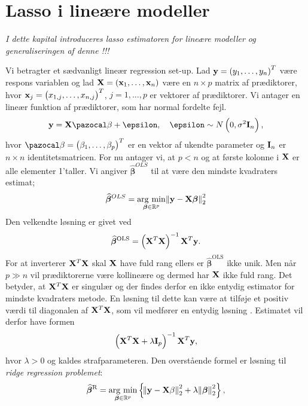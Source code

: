 \chapter{Lasso i lineære modeller}
\textit{I dette kapital introduceres lasso estimatoren for lineære modeller og generaliseringen af denne !!!}

Vi betragter et sædvanligt lineær regression set-up. Lad $\textbf{y} = \del{y_1, \dots, y_n}^T$ være respons variablen og lad $\textbf{X} = \del{\textbf{x}_1, \dots, \textbf{x}_n}$ være en $n \times p$ matrix af prædiktorer, hvor $\textbf{x}_j = \del{x_{1,j}, \dots, x_{n,j}}^T$, $j = 1, \dots, p$ er vektorer af prædiktorer. 
Vi antager en lineær funktion af prædiktorer, som har normal fordelte fejl. 
\begin{align*}
\textbf{y} = \textbf{X} \mathcal{\beta} + \epsilon, \quad \epsilon \sim N \del{0, \sigma^2 \text{\textbf{I}}_n},
\end{align*}
hvor $\mathcal{\beta} = \del{\beta_1, \dots, \beta_p}^T$ er en vektor af ukendte parameter og $\text{\textbf{I}}_n$ er $n \times n$ identitetsmatricen. 
For nu antager vi, at $p<n$ og at første kolonne i $\mathbf{X}$ er alle elementer 1'taller. 
Vi angiver $\widehat{\boldsymbol{\beta}}^{OLS}$ til at være den mindste kvadraters estimat;
\begin{align*}
\widehat{\boldsymbol{\beta}}^{OLS} = \underset{\boldsymbol\beta \in \mathbb{R}^p}{\operatorname*{\arg\,\min}} \norm{ \textbf{y} - \textbf{X}\boldsymbol\beta}^2_2
\end{align*}
Den velkendte løsning er givet ved 
\begin{align*}
\widehat{\boldsymbol\beta}^{\text{OLS}} = \del{\X^T \X}^{-1} \X^T \y.
\end{align*}
For at inverterer $\mathbf{X}^T \mathbf{X}$ skal $\mathbf{X}$ have fuld rang ellers er $\widehat{\boldsymbol\beta}^{\text{OLS}}$ ikke unik. 
Men når  \(p \gg n\) vil prædiktorerne være kollineære og dermed har \(\mathbf{X}\) ikke fuld rang.
Det betyder, at $\mathbf{X}^T \mathbf{X}$ er singulær og der findes derfor en ikke entydig estimator for mindste kvadraters metode.
En løsning til dette kan være at tilføje et positiv værdi til diagonalen af $\mathbf{X}^T \mathbf{X}$, som vil medfører en entydig løsning . 
Estimatet vil derfor have formen
\begin{align*}
 \del{\X^T \X + \lambda \text{\textbf{I}}_p}^{-1} \X^T \y,
\end{align*}
hvor $\lambda > 0$ og kaldes strafparameteren. Den overstående formel er løsning til \textit{ridge regression problemet}:
\begin{align}
 \widehat{\boldsymbol\beta}^{\text{R}} = \underset{\boldsymbol\beta \in \R^p}{\argmin}  \cbr{\norm{\y - \X\beta}^2_2 + \lambda \norm{\boldsymbol\beta}_2^2},
\end{align} \label{eq:2.8}
